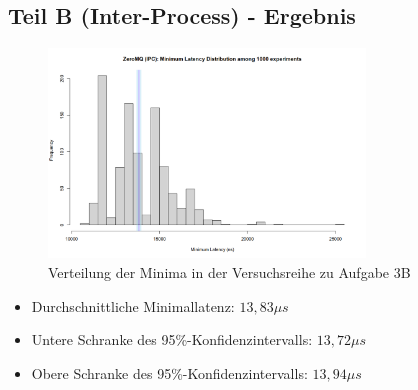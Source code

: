 \documentclass[12pt]{article}
\begin{document}
\subsection{Teil B (Inter-Process) - Ergebnis}
\begin{figure}[H]
	\centering
	\includegraphics[width=0.75\textwidth]{./img/zeromq_ipc}
	\caption{Verteilung der Minima in der Versuchsreihe zu Aufgabe 3B}
	\label{img:zeromq:ipc}
\end{figure}

\begin{itemize}
	\item Durchschnittliche Minimallatenz: $13,83 \mu s$
	\item Untere Schranke des 95\%-Konfidenzintervalls: $13,72 \mu s$
	\item Obere Schranke des 95\%-Konfidenzintervalls: $13,94 \mu s$
\end{itemize}
\end{document}
